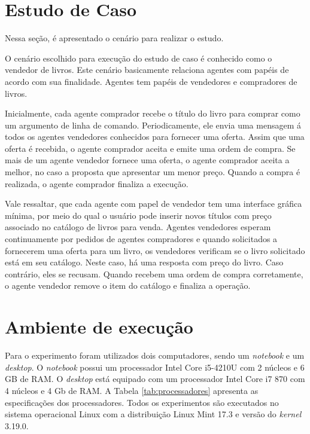 \documentclass[conference]{IEEEtran}
\begin{document}
    \section{Estudo de Caso}
    Nessa seção, é apresentado o cenário para realizar o estudo.
    
    O cenário escolhido para execução do estudo de caso é conhecido como o vendedor de livros. Este cenário basicamente relaciona agentes com papéis de acordo com sua finalidade.  Agentes tem papéis de vendedores e compradores de livros. 
        
    Inicialmente, cada agente comprador recebe o título do livro para comprar como um argumento de linha de comando. Periodicamente, ele envia uma mensagem á todos os agentes vendedores conhecidos para fornecer uma oferta. Assim que uma oferta é recebida, o agente comprador aceita e emite uma ordem de compra. Se mais de um agente vendedor fornece uma oferta, o agente comprador aceita a melhor, no caso a proposta que apresentar um menor preço. Quando a compra é realizada, o agente comprador finaliza a execução.
        
    Vale ressaltar, que cada agente com papel de vendedor tem uma interface gráfica mínima, por meio do qual o usuário pode inserir novos títulos com preço associado no catálogo de livros para venda. Agentes vendedores esperam continuamente por pedidos de agentes compradores e quando solicitados a fornecerem uma oferta para um livro, os vendedores verificam se o livro solicitado está em seu catálogo. Neste caso, há uma resposta com preço do livro. Caso contrário, eles se recusam. Quando recebem uma ordem de compra corretamente, o agente vendedor remove o item do catálogo e finaliza a operação.
    
    
    \section{Ambiente de execução}
    
    Para o experimento foram utilizados dois computadores, sendo um \textit{notebook} e um \textit{desktop}. O \textit{notebook} possui um processador Intel Core i5-4210U \cite{inteli5} com 2 núcleos e 6 GB de RAM. O \textit{desktop} está equipado com um processador Intel Core i7 870 com 4 núcleos e 4 Gb de RAM. A Tabela \ref{tab:processadores} apresenta as especificações dos processadores. Todos os experimentos são executados no sistema operacional  Linux com a distribuição Linux Mint 17.3 e versão do \textit{kernel} 3.19.0.
        
\end{document}
